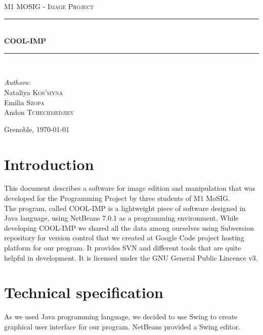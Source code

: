 \documentclass[a4paper,12pt]{article}
\newcommand{\HRule}{\rule{\linewidth}{0.5mm}}
\begin{document}
\begin{titlepage}
\begin{center}
\textsc{\LARGE M1 MOSIG - Image Project}\\[1.5cm]

\HRule \\[0.6cm]
{ \huge \bfseries COOL-IMP}\\[0.4cm]
\HRule \\[3.5cm]

\end{center}

\begin{minipage}{0.5\textwidth}
\begin{flushleft} \large
\emph{Authors:}\\
Nataliya \textsc{Kos'myna}\\
Emilia \textsc{Szopa}\\
Andon \textsc{Tchechmedjiev}
\end{flushleft}
\end{minipage}

\vfill
\begin{center}
Grenoble, \today
\end{center}
\end{titlepage}



\section{Introduction}
This document describes a software for image edition and manipulation that was developed for the Programming Project by three students of M1 MoSIG.\\
The program, called COOL-IMP is a lightweight piece of software designed in Java language, using NetBeans 7.0.1 as a programming environment. While developing COOL-IMP we shared all the data among ourselves using Subversion repository for version control that we created at Google Code project hosting platform for our program. It provides SVN and different tools that are quite helpful in development. It is licensed under the GNU General Public Lincence v3.

\section{Technical specification}
As we used Java programming language, we decided to use Swing to create graphical user interface for our program. NetBeans provided a Swing editor.
\end{document}
